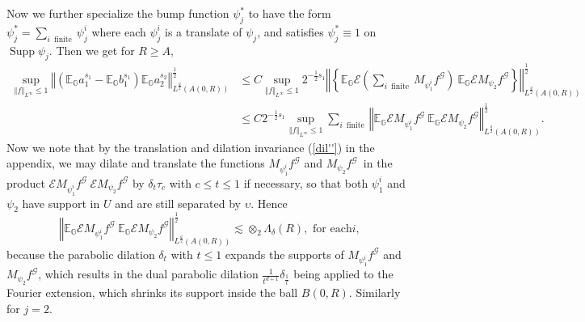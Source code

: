 \documentclass{amsart}%
\theoremstyle{plain}
\numberwithin{equation}{section}
\begin{document}
Now we further specialize the bump function $\psi_{j}^{\ast}$ to have the form
$\psi_{j}^{\ast}=\sum_{i\ \operatorname*{finite}}\psi_{j}^{i}$ where each
$\psi_{j}^{i}$ is a translate of $\psi_{j}$, and satisfies $\psi_{j}^{\ast
}\equiv1$ on $\operatorname*{Supp}\psi_{j}$. Then we get for $R\geq A$,%
\begin{align*}
\sup_{\left\Vert f\right\Vert _{L^{\infty}}\leq1}\left\Vert \left(
\mathbb{E}_{\mathbb{G}}a_{1}^{s_{1}}-\mathbb{E}_{\mathbb{G}}b_{1}^{s_{1}%
}\right)  \mathbb{E}_{\mathbb{G}}a_{2}^{s_{2}}\right\Vert _{L^{\frac{q}{2}%
}\left(  A\left(  0,R\right)  \right)  }^{\frac{1}{2}}  & \leq C\sup
_{\left\Vert f\right\Vert _{L^{\infty}}\leq1}2^{-\frac{1}{2}s_{1}}\left\Vert
\left\{  \mathbb{E}_{\mathbb{G}}\mathcal{E}\left(  \sum
_{i\ \operatorname*{finite}}M_{\psi_{1}^{i}}f^{\mathcal{G}}\right)
\ \mathbb{E}_{\mathbb{G}}\mathcal{E}M_{\psi_{2}}f^{\mathcal{G}}\right\}
\right\Vert _{L^{\frac{q}{2}}\left(  A\left(  0,R\right)  \right)  }^{\frac
{1}{2}}\\
& \leq C2^{-\frac{1}{2}s_{1}}\sup_{\left\Vert f\right\Vert _{L^{\infty}}\leq
1}\sum_{i\ \operatorname*{finite}}\left\Vert \mathbb{E}_{\mathbb{G}%
}\mathcal{E}M_{\psi_{1}^{i}}f^{\mathcal{G}}\ \mathbb{E}_{\mathbb{G}%
}\mathcal{E}M_{\psi_{2}}f^{\mathcal{G}}\right\Vert _{L^{\frac{q}{2}}\left(
A\left(  0,R\right)  \right)  }^{\frac{1}{2}}.
\end{align*}
Now we note that by the translation and dilation invariance (\ref{dil''}) in
the appendix, we may dilate and translate the functions $M_{\psi_{1}^{i}%
}f^{\mathcal{G}}$ and $M_{\psi_{2}}f^{\mathcal{G}}$\ in the product
$\mathcal{E}M_{\psi_{1}^{i}}f^{\mathcal{G}}\ \mathcal{E}M_{\psi_{2}%
}f^{\mathcal{G}}$ by $\delta_{t}\tau_{c}$ with $c\leq t\leq1$ if necessary, so
that both $\psi_{1}^{i}$ and $\psi_{2}$ have support in $U$ and are still
separated by $\upsilon$. Hence%
\begin{equation}
\left\Vert \mathbb{E}_{\mathbb{G}}\mathcal{E}M_{\psi_{1}^{i}}f^{\mathcal{G}%
}\ \mathbb{E}_{\mathbb{G}}\mathcal{E}M_{\psi_{2}}f^{\mathcal{G}}\right\Vert
_{L^{\frac{q}{2}}\left(  A\left(  0,R\right)  \right)  }^{\frac{1}{2}}%
\lesssim\otimes_{2}\Lambda_{\delta}\left(  R\right)  ,\text{ \ \ \ \ for each
}i,\label{trans inv}%
\end{equation}
because the parabolic dilation $\delta_{t}$ with $t\leq1$ expands the supports
of $M_{\psi_{1}^{i}}f^{\mathcal{G}}$ and $M_{\psi_{2}}f^{\mathcal{G}}$, which
results in the dual parabolic dilation $\frac{1}{t^{d+1}}\delta_{\frac{1}{t}}$
being applied to the Fourier extension, which shrinks its support inside the
ball $B\left(  0,R\right)  $. Similarly for $j=2$.
\end{document}
